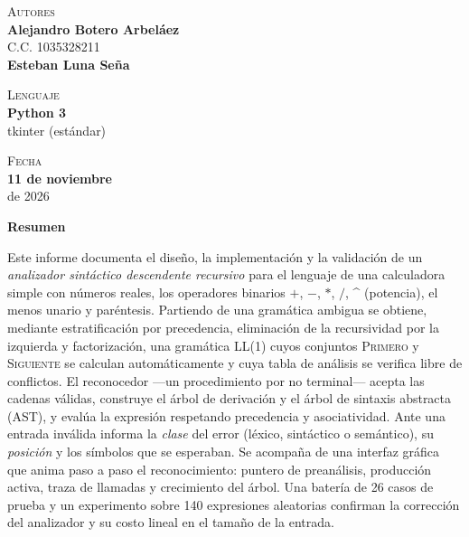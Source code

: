 \documentclass[11pt,a4paper]{article}
\newcommand{\PRIMERO}{\textsc{Primero}}
\newcommand{\SIGUIENTE}{\textsc{Siguiente}}
\begin{document}
\begin{titlepage}
\vfill

\begin{minipage}[t]{0.5\textwidth}
  {\sffamily\footnotesize\color{gris}\textsc{Autores}}\\[2pt]
  {\sffamily\bfseries\color{tinta} Alejandro Botero Arbeláez}\\
  {\sffamily\small\color{gris} C.C. 1035328211}\\[4pt]
  {\sffamily\bfseries\color{tinta} Esteban Luna Seña}
\end{minipage}%
\begin{minipage}[t]{0.25\textwidth}
  {\sffamily\footnotesize\color{gris}\textsc{Lenguaje}}\\[2pt]
  {\sffamily\bfseries\color{tinta} Python 3}\\
  {\sffamily\small\color{gris} tkinter (estándar)}
\end{minipage}%
\begin{minipage}[t]{0.25\textwidth}
  {\sffamily\footnotesize\color{gris}\textsc{Fecha}}\\[2pt]
  {\sffamily\bfseries\color{tinta} 11 de noviembre}\\
  {\sffamily\small\color{gris} de 2026}
\end{minipage}
\end{titlepage}

\thispagestyle{empty}
\begin{center}
{\sffamily\large\bfseries\color{tinta} Resumen}
\end{center}
\noindent
Este informe documenta el diseño, la implementación y la validación de un \emph{analizador sintáctico
descendente recursivo} para el lenguaje de una calculadora simple con números reales, los operadores
binarios $+$, $-$, $*$, $/$, \textasciicircum{} (potencia), el menos unario y paréntesis. Partiendo de una gramática
ambigua se obtiene, mediante estratificación por precedencia, eliminación de la recursividad por la
izquierda y factorización, una gramática \textsc{LL(1)} cuyos conjuntos \PRIMERO{} y \SIGUIENTE{} se
calculan automáticamente y cuya tabla de análisis se verifica libre de conflictos. El reconocedor ---un
procedimiento por no terminal--- acepta las cadenas válidas, construye el árbol de derivación y el árbol
de sintaxis abstracta (AST), y evalúa la expresión respetando precedencia y asociatividad. Ante una
entrada inválida informa la \emph{clase} del error (léxico, sintáctico o semántico), su \emph{posición}
y los símbolos que se esperaban. Se acompaña de una interfaz gráfica que anima paso a paso el
reconocimiento: puntero de preanálisis, producción activa, traza de llamadas y crecimiento del árbol.
Una batería de 26 casos de prueba y un experimento sobre 140 expresiones aleatorias confirman la
corrección del analizador y su costo lineal en el tamaño de la entrada.
\end{document}
